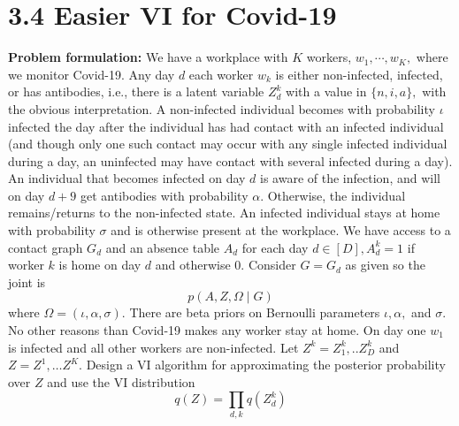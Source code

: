 \section*{3.4 Easier VI for Covid-19}
\begin{tcolorbox}
\textbf{Problem formulation:} We have a workplace with $K$ workers, $w_{1}, \cdots, w_{K},$ where we monitor Covid-19. Any day $d$ each worker $w_{k}$ is either non-infected, infected, or has antibodies, i.e., there is a latent variable $Z_{d}^{k}$ with a value in $\{n, i, a\},$ with the obvious interpretation. A non-infected individual becomes with probability $\iota$ infected the day after the individual has had contact with an infected individual (and though only one such contact may occur with any single infected individual during a day, an uninfected may have contact with several infected during a day). An individual that becomes infected on day $d$ is aware of the infection, and will on day $d+9$ get antibodies with probability $\alpha .$ Otherwise, the individual remains/returns to the non-infected state. An infected individual stays at home with probability $\sigma$ and is otherwise present at the workplace. We have access to a contact graph $G_{d}$ and an absence table $A_{d}$ for each day $d \in[D], A_{d}^{k}=1$ if worker $k$ is home on day $d$ and otherwise $0 .$ Consider $G=G_{d}$ as given so the joint is
$$
p(A, Z, \Omega \mid G)
$$
where $\Omega=(\iota, \alpha, \sigma) .$ There are beta priors on Bernoulli parameters $\iota, \alpha,$ and $\sigma .$ No other reasons than Covid-19 makes any worker stay at home. On day one $w_{1}$ is infected and all other workers are non-infected. Let $Z^{k}=Z_{1}^{k}, . . Z_{D}^{k}$ and $Z=Z^{1}, \ldots Z^{K} .$ Design a VI algorithm for approximating the posterior probability over $Z$ and use the VI distribution
$$
q(Z)=\prod_{d, k} q\left(Z_{d}^{k}\right)
$$
\end{tcolorbox}

